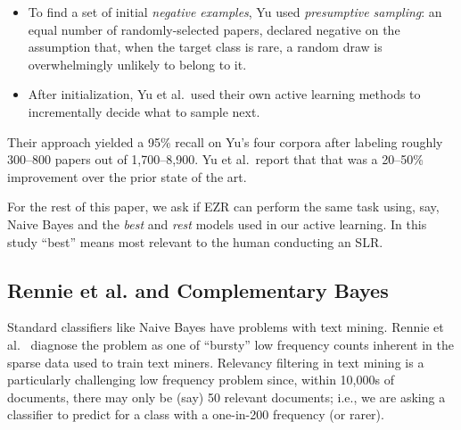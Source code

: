 \documentclass[AMA,STIX2COL]{WileyNJDv5}
\begin{document}
{{\begin{itemize}
\item To
find a set of initial {\em negative examples}, Yu used {\em presumptive sampling}:
  an equal number of randomly-selected papers, declared negative on
  the assumption that, when the target class is rare, a random draw
  is overwhelmingly unlikely to belong to it.
  \item After initialization, Yu et al.\ used their own active learning
  methods to incrementally decide what to sample next.
\end{itemize}
Their approach yielded a 95\% recall on Yu's four corpora after labeling
roughly 300--800 papers out of 1,700--8,900. 
Yu et al.\ report that that was a
20--50\% improvement over the prior state of the
art.

For the rest of this paper,  we  ask if EZR can perform the same task using, say,
Naive Bayes and the {\em best} and {\em rest} models
used in our active learning.  
In this study ``best'' means most relevant to the human conducting an SLR.

\subsection{Rennie et al. and Complementary Bayes}
Standard classifiers like Naive Bayes have problems with text mining. 
Rennie et al.~\cite{rennie2003tackling} diagnose the problem as one
of ``bursty'' low frequency counts inherent in the sparse data used to train text miners.
Relevancy filtering in text mining is a particularly challenging low frequency problem since, within 10,000s of documents, there may only be (say) 50 relevant documents;
i.e., we are asking a classifier to predict for a class with a one-in-200 frequency (or rarer).  


}}
\end{document}
